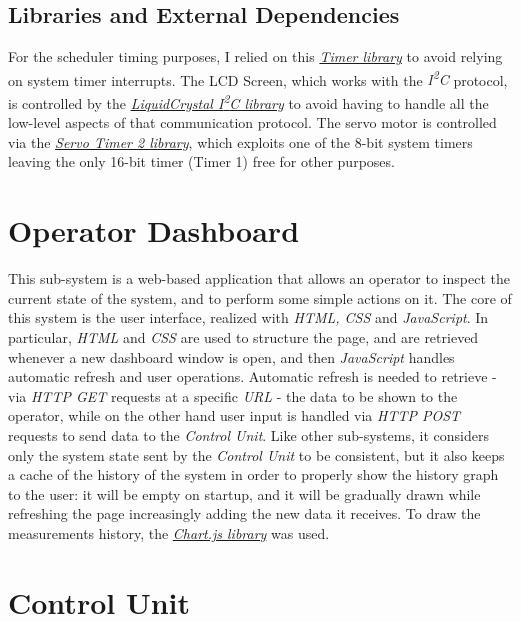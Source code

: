 \documentclass[a4paper,12pt]{report}
\begin{document}
		\subsection{Libraries and External Dependencies}
		For the scheduler timing purposes, I relied on this \href{https://github.com/sstaub/Timer}{\textit{Timer library}} to avoid relying on system timer interrupts.
		\newline The LCD Screen, which works with the \textit{I\textsuperscript{2}C} protocol, is controlled by the \href{https://docs.arduino.cc/libraries/liquidcrystal-i2c/}{\textit{LiquidCrystal I\textsuperscript{2}C library}} to avoid having to handle all the low-level aspects of that communication protocol.
		\newline The servo motor is controlled via the \href{https://github.com/nabontra/ServoTimer2}{\textit{Servo Timer 2 library}}, which exploits one of the 8-bit system timers leaving the only 16-bit timer (Timer 1) free for other purposes.
	\section{Operator Dashboard}
	This sub-system is a web-based application that allows an operator to inspect the current state of the system, and to perform some simple actions on it. The core of this system is the user interface, realized with \textit{HTML, CSS} and \textit{JavaScript}.
	\newline In particular, \textit{HTML} and \textit{CSS} are used to structure the page, and are retrieved whenever a new dashboard window is open, and then \textit{JavaScript} handles automatic refresh and user operations. Automatic refresh is needed to retrieve - via \textit{HTTP GET} requests at a specific \textit{URL} - the data to be shown to the operator, while on the other hand user input is handled via \textit{HTTP POST} requests to send data to the \textit{Control Unit}.
	\newline Like other sub-systems, it considers only the system state sent by the \textit{Control Unit} to be consistent, but it also keeps a cache of the history of the system in order to properly show the history graph to the user: it will be empty on startup, and it will be gradually drawn while refreshing the page increasingly adding the new data it receives.
	\newline To draw the measurements history, the \href{https://www.w3schools.com/ai/ai_chartjs.asp}{\textit{Chart.js library}} was used.
	\section{Control Unit}
	
\end{document}
